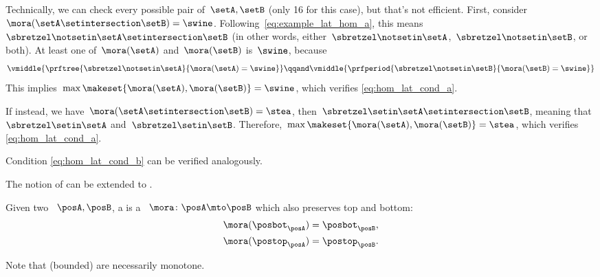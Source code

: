 \begin{example}
    Technically, we can check every possible pair of~$\setA,\setB$ (only 16 for this case), but that's not efficient.
    First, consider~$\mora(\setA\setintersection \setB)=\swine$.
    Following~\cref{eq:example_lat_hom_a}, this means~$\sbretzel \notsetin \setA\setintersection \setB$ (in other words, either~$\sbretzel \notsetin \setA$,~$\sbretzel \notsetin \setB$, or both).
    At least one of~$\mora(\setA)$ and~$\mora(\setB)$ is~$\swine$, because
    \begin{equation}
        \vmiddle{
            \prftree{
                \sbretzel \notsetin \setA
            }{
                \mora(\setA) = \swine
            }
        }
        \qqand
        \vmiddle{
            \prfperiod{
                \sbretzel \notsetin \setB
            }{
                \mora(\setB) = \swine
            }
        }
    \end{equation}
    This implies~$\max\makeset{\mora(\setA),\mora(\setB)}=\swine$, which verifies \cref{eq:hom_lat_cond_a}.

    If instead, we have~$\mora(\setA\setintersection \setB)=\stea$, then~$\sbretzel \setin \setA\setintersection \setB$, meaning that~$\sbretzel \setin \setA$ and~$\sbretzel \setin \setB$.
    Therefore,~$\max\makeset{ \mora(\setA),\mora(\setB)}=\stea$, which verifies \cref{eq:hom_lat_cond_a}.

    Condition \cref{eq:hom_lat_cond_b} can be verified analogously.
\end{example}

The notion of  can be extended to .

\begin{ctdefinition}
    \label{def:bounded-lattice-homomorphism}
    Given two ~$\posA,\posB$, a  is a ~$\mora\colon \posA\mto \posB$ which also preserves top and bottom:
    \begin{equation}
        \begin{aligned}
            \mora(\posbot_\posA) & =\posbot_\posB, \\
            \mora(\postop_\posA) & =\postop_\posB.
        \end{aligned}
    \end{equation}
\end{ctdefinition}

Note that (bounded)  are necessarily monotone.

